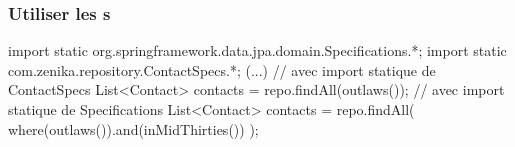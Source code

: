 \begin{frame}[fragile]
 \frametitle{Utiliser les s}

 \begin{javacode}
import static org.springframework.data.jpa.domain.Specifications.*;
import static com.zenika.repository.ContactSpecs.*;
(...)
// avec import statique de ContactSpecs
List<Contact> contacts = repo.findAll(outlaws());
// avec import statique de Specifications
List<Contact> contacts = repo.findAll(
  where(outlaws()).and(inMidThirties())
);
 \end{javacode}

\end{frame}